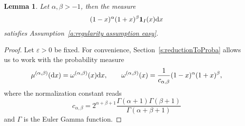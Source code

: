 \documentclass[a4paper,11pt]{article}
\numberwithin{equation}{section}
\newtheorem{lemma}[]{Lemma}
\theoremstyle{definition}
\newcommand{\bs}{\boldsymbol}
\renewcommand{\epsilon}{\varepsilon}
\renewcommand{\d}{ {\rm d}}
\def\IND{{\bs 1}}
\begin{document}
\begin{lemma}
\label{Bound derivative Jacobi} Let $\alpha,\beta>-1$, then the measure
$$
(1-x)^\alpha (1+x)^\beta \IND_I(x)\d x
$$
satisfies Assumption~\ref{a:regularity assumption easy}.
\end{lemma}

\begin{proof} Let $\epsilon>0$ be fixed. For convenience, Section~\ref{s:reductionToProba} allows
  us to work with the probability measure
$$
\mu^{(\alpha,\beta)}(\d x)=\omega^{(\alpha,\beta)}(x) \d x,\qquad \omega^{(\alpha,\beta)}(x)=\frac1{c_{\alpha,\beta}}(1-x)^\alpha(1+x)^\beta,
$$
where the normalization constant reads
$$
c_{\alpha,\beta}=
2^{\alpha+\beta+1}\frac{\Gamma(\alpha+1)\Gamma(\beta+1)}{\Gamma(\alpha+\beta+1)}
$$
and $\Gamma$ is the Euler Gamma function.


\end{proof}
\end{document}
